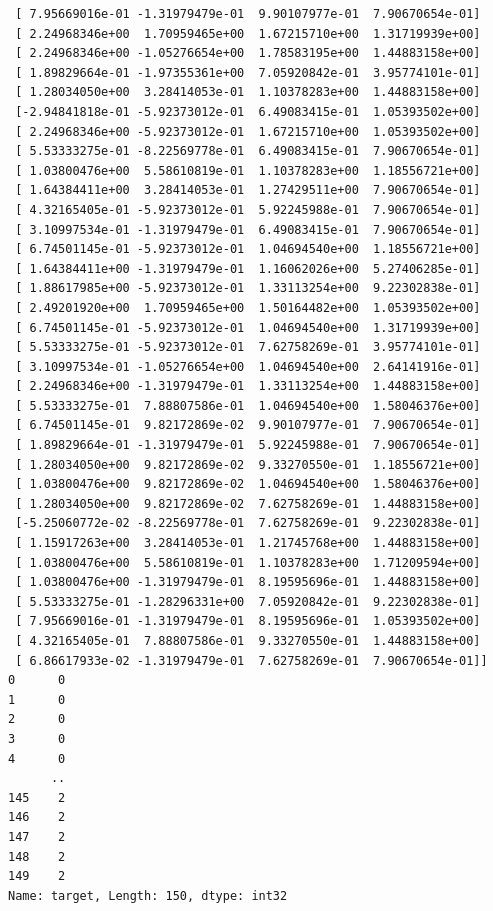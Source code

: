 \documentclass[
]{article}
\begin{document}
\begin{lstlisting}
 [ 7.95669016e-01 -1.31979479e-01  9.90107977e-01  7.90670654e-01]
 [ 2.24968346e+00  1.70959465e+00  1.67215710e+00  1.31719939e+00]
 [ 2.24968346e+00 -1.05276654e+00  1.78583195e+00  1.44883158e+00]
 [ 1.89829664e-01 -1.97355361e+00  7.05920842e-01  3.95774101e-01]
 [ 1.28034050e+00  3.28414053e-01  1.10378283e+00  1.44883158e+00]
 [-2.94841818e-01 -5.92373012e-01  6.49083415e-01  1.05393502e+00]
 [ 2.24968346e+00 -5.92373012e-01  1.67215710e+00  1.05393502e+00]
 [ 5.53333275e-01 -8.22569778e-01  6.49083415e-01  7.90670654e-01]
 [ 1.03800476e+00  5.58610819e-01  1.10378283e+00  1.18556721e+00]
 [ 1.64384411e+00  3.28414053e-01  1.27429511e+00  7.90670654e-01]
 [ 4.32165405e-01 -5.92373012e-01  5.92245988e-01  7.90670654e-01]
 [ 3.10997534e-01 -1.31979479e-01  6.49083415e-01  7.90670654e-01]
 [ 6.74501145e-01 -5.92373012e-01  1.04694540e+00  1.18556721e+00]
 [ 1.64384411e+00 -1.31979479e-01  1.16062026e+00  5.27406285e-01]
 [ 1.88617985e+00 -5.92373012e-01  1.33113254e+00  9.22302838e-01]
 [ 2.49201920e+00  1.70959465e+00  1.50164482e+00  1.05393502e+00]
 [ 6.74501145e-01 -5.92373012e-01  1.04694540e+00  1.31719939e+00]
 [ 5.53333275e-01 -5.92373012e-01  7.62758269e-01  3.95774101e-01]
 [ 3.10997534e-01 -1.05276654e+00  1.04694540e+00  2.64141916e-01]
 [ 2.24968346e+00 -1.31979479e-01  1.33113254e+00  1.44883158e+00]
 [ 5.53333275e-01  7.88807586e-01  1.04694540e+00  1.58046376e+00]
 [ 6.74501145e-01  9.82172869e-02  9.90107977e-01  7.90670654e-01]
 [ 1.89829664e-01 -1.31979479e-01  5.92245988e-01  7.90670654e-01]
 [ 1.28034050e+00  9.82172869e-02  9.33270550e-01  1.18556721e+00]
 [ 1.03800476e+00  9.82172869e-02  1.04694540e+00  1.58046376e+00]
 [ 1.28034050e+00  9.82172869e-02  7.62758269e-01  1.44883158e+00]
 [-5.25060772e-02 -8.22569778e-01  7.62758269e-01  9.22302838e-01]
 [ 1.15917263e+00  3.28414053e-01  1.21745768e+00  1.44883158e+00]
 [ 1.03800476e+00  5.58610819e-01  1.10378283e+00  1.71209594e+00]
 [ 1.03800476e+00 -1.31979479e-01  8.19595696e-01  1.44883158e+00]
 [ 5.53333275e-01 -1.28296331e+00  7.05920842e-01  9.22302838e-01]
 [ 7.95669016e-01 -1.31979479e-01  8.19595696e-01  1.05393502e+00]
 [ 4.32165405e-01  7.88807586e-01  9.33270550e-01  1.44883158e+00]
 [ 6.86617933e-02 -1.31979479e-01  7.62758269e-01  7.90670654e-01]]
0      0
1      0
2      0
3      0
4      0
      ..
145    2
146    2
147    2
148    2
149    2
Name: target, Length: 150, dtype: int32
\end{lstlisting}
\end{document}
